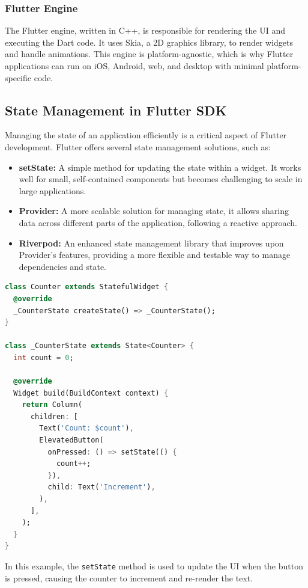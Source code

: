 \documentclass[12pt,a4paper]{report}
\begin{document}
\subsubsection{Flutter Engine}
The Flutter engine, written in C++, is responsible for rendering the UI and executing the Dart code. It uses Skia, a 2D graphics library, to render widgets and handle animations. This engine is platform-agnostic, which is why Flutter applications can run on iOS, Android, web, and desktop with minimal platform-specific code.

\subsection{State Management in Flutter SDK}
Managing the state of an application efficiently is a critical aspect of Flutter development. Flutter offers several state management solutions, such as:
\begin{itemize}
    \item \textbf{setState:} A simple method for updating the state within a widget. It works well for small, self-contained components but becomes challenging to scale in large applications.
    \item \textbf{Provider:} A more scalable solution for managing state, it allows sharing data across different parts of the application, following a reactive approach.
    \item \textbf{Riverpod:} An enhanced state management library that improves upon Provider’s features, providing a more flexible and testable way to manage dependencies and state.
\end{itemize}

\begin{lstlisting}[language=Dart, caption={Simple setState Example}]
class Counter extends StatefulWidget {
  @override
  _CounterState createState() => _CounterState();
}

class _CounterState extends State<Counter> {
  int count = 0;

  @override
  Widget build(BuildContext context) {
    return Column(
      children: [
        Text('Count: $count'),
        ElevatedButton(
          onPressed: () => setState(() {
            count++;
          }),
          child: Text('Increment'),
        ),
      ],
    );
  }
}
\end{lstlisting}

In this example, the \texttt{setState} method is used to update the UI when the button is pressed, causing the counter to increment and re-render the text.
\end{document}
